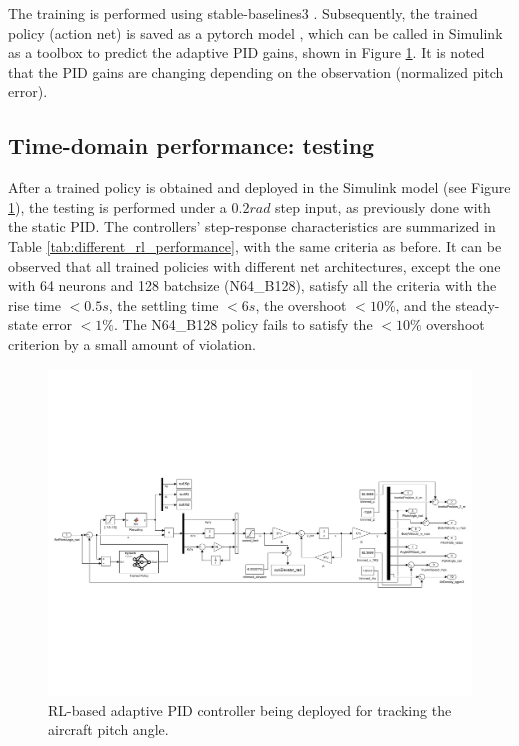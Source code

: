 \documentclass[lettersize,journal]{IEEEtran}
\begin{document}
The training is performed using stable-baselines3 \cite{ref14}. Subsequently, the trained policy (action net) is saved as a pytorch model \cite{ref15}, which can be called in Simulink as a toolbox to predict the adaptive PID gains, shown in Figure \ref{fig:rl_based_adaptive_pid_scheme}. It is noted that the PID gains are changing depending on the observation (normalized pitch error).

\subsection{Time-domain performance: testing}
After a trained policy is obtained and deployed in the Simulink model (see Figure \ref{fig:rl_based_adaptive_pid_scheme}), the testing is performed under a $0.2rad$ step input, as previously done with the static PID. The controllers' step-response characteristics are summarized in Table \ref{tab:different_rl_performance}, with the same criteria as before. It can be observed that all trained policies with different net architectures, except the one with 64 neurons and 128 batchsize (N64\_B128), satisfy all the criteria with the rise time $<0.5s$, the settling time $<6s$, the overshoot $<10\%$, and the steady-state error $<1\%$. The N64\_B128 policy fails to satisfy the $<10\%$ overshoot criterion by a small amount of violation.

\begin{figure}[!t]
\centering
\includegraphics[width=7in]{figs/rl_based_adaptive_pid_scheme.pdf}%
\caption{RL-based adaptive PID controller being deployed for tracking the aircraft pitch angle.}
\label{fig:rl_based_adaptive_pid_scheme}
\end{figure}
\end{document}
